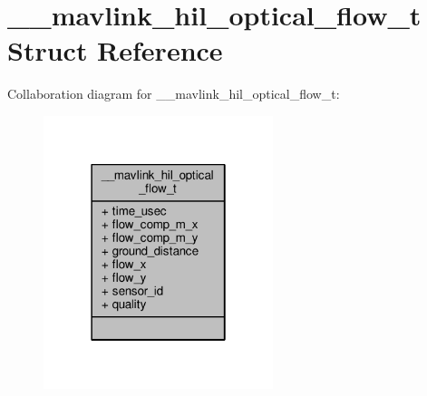 \hypertarget{struct____mavlink__hil__optical__flow__t}{\section{\+\_\+\+\_\+mavlink\+\_\+hil\+\_\+optical\+\_\+flow\+\_\+t Struct Reference}
\label{struct____mavlink__hil__optical__flow__t}
}


Collaboration diagram for \+\_\+\+\_\+mavlink\+\_\+hil\+\_\+optical\+\_\+flow\+\_\+t\+:
\nopagebreak
\begin{figure}[H]
\begin{center}
\leavevmode
\includegraphics[width=190pt]{struct____mavlink__hil__optical__flow__t__coll__graph}
\end{center}
\end{figure}
